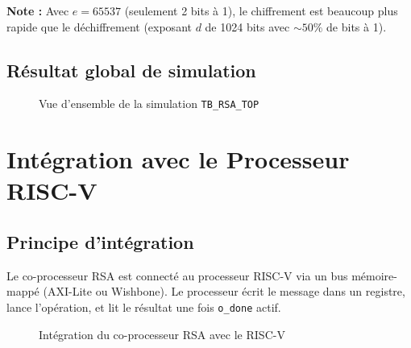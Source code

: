 \textbf{Note :} Avec $e = 65537$ (seulement 2 bits à 1), le chiffrement
est beaucoup plus rapide que le déchiffrement (exposant $d$ de 1024 bits
avec $\sim 50\%$ de bits à 1).

\subsection{Résultat global de simulation}
\begin{figure}[H]
\centering
{}
\caption{Vue d'ensemble de la simulation \texttt{TB\_RSA\_TOP}}
\label{fig:sim_full}
\end{figure}


\section{Intégration avec le Processeur RISC-V}
\label{ch:riscv}

\subsection{Principe d'intégration}

Le co-processeur RSA est connecté au processeur RISC-V via un bus
mémoire-mappé (AXI-Lite ou Wishbone). Le processeur écrit le message
dans un registre, lance l'opération, et lit le résultat une fois
\texttt{o\_done} actif.

\begin{figure}[H]
\centering
{}
\caption{Intégration du co-processeur RSA avec le RISC-V}
\label{fig:integration}
\end{figure}

